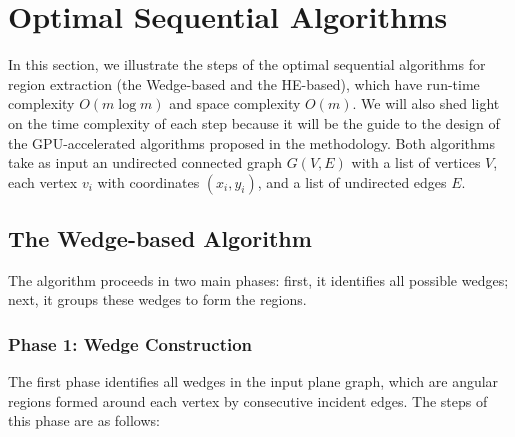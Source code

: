\section{Optimal Sequential Algorithms}
In this section, we illustrate the steps of the optimal sequential algorithms for region extraction (the Wedge-based and the HE-based), which have run-time complexity \( O (m \log m) \) and space complexity \( O (m) \). We will also shed light on the time complexity of each step because it will be the guide to the design of the GPU-accelerated algorithms proposed in the methodology. Both algorithms take as input an undirected connected graph \(G(V, E)\) with a list of vertices \(V\), each vertex \(v_i\) with coordinates \((x_i, y_i)\), and a list of undirected edges \(E\). 


\subsection{The Wedge-based Algorithm}
The algorithm proceeds in two main phases: first, it identifies all possible wedges; next, it groups these wedges to form the regions.
\subsubsection{Phase 1: Wedge Construction}
The first phase identifies all wedges in the input plane graph, which are angular regions formed around each vertex by consecutive incident edges. The steps of this phase are as follows:

